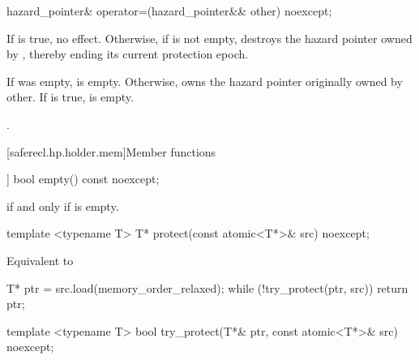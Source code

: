 \begin{itemdecl}
hazard_pointer& operator=(hazard_pointer&& other) noexcept;
\end{itemdecl}

\begin{itemdescr}

\effects 
If  is true, no effect. Otherwise, if  is not empty, destroys
the hazard pointer owned by , thereby ending its current protection epoch.

\ensures 
If  was empty,  is empty. Otherwise,  owns the hazard
pointer originally owned by other. If  is true,  is empty.

\returns 
{}.

\end{itemdescr}

[saferecl.hp.holder.mem]{Member functions}

\begin{itemdecl}
[[nodiscard]] bool empty() const noexcept;
\end{itemdecl}

\begin{itemdescr}

\returns 
{} if and only if  is empty.

\end{itemdescr}


\begin{itemdecl}
template <typename T> T* protect(const atomic<T*>& src) noexcept;
\end{itemdecl}

\begin{itemdescr}

\effects 
Equivalent to
\begin{codeblock}
T* ptr = src.load(memory_order_relaxed);
while (!try_protect(ptr, src)) {}
return ptr;
\end{codeblock}

\end{itemdescr}

\begin{itemdecl}
template <typename T> bool try_protect(T*& ptr, const atomic<T*>& src) noexcept;
\end{itemdecl}

